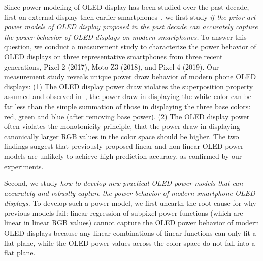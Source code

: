 Since power modeling of OLED display has been studied
over the past decade, first on external display then
earlier smartphones~\cite{dong2009current,kim2013runtime,park2015accurate},
we first study {\em if the prior-art power models of OLED display proposed
  in the past decade can accurately capture the power behavior of OLED
  displays on modern smartphones.}  To answer this question, we
conduct a measurement study to characterize the power behavior of OLED
displays on three representative smartphones from 
three recent generations, Pixel 2 (2017), Moto Z3 (2018), and Pixel 4 (2019).
%
Our measurement study reveals
unique power draw behavior of modern phone OLED displays: (1) The OLED
display power draw violates the superposition property assumed and observed
in~\cite{dong2009current}, \eg the power draw in displaying
the white color can be far less than the simple summation of those in
displaying the three base colors: red, green and blue (after removing
base power).  (2) The OLED
display power often violates the  monotonicity principle, that
the power draw in displaying canonically larger RGB values in the color
space should be higher.
The two findings suggest that previously proposed
linear and non-linear OLED power models are unlikely to achieve high
prediction accuracy, as confirmed by our experiments.

Second, we study {\em how to develop new practical OLED power models that
  can accurately and robustly capture the power behavior of modern smartphone OLED
  displays.}  To develop such a power model,
we first unearth the root cause for why previous models fail:
linear regression of subpixel power functions (which are linear in linear RGB
values)
cannot capture the OLED power behavior of modern OLED displays
because any linear combinations of linear functions 
can only fit a flat plane, while the OLED power
values across the color space do not fall into a flat plane.

